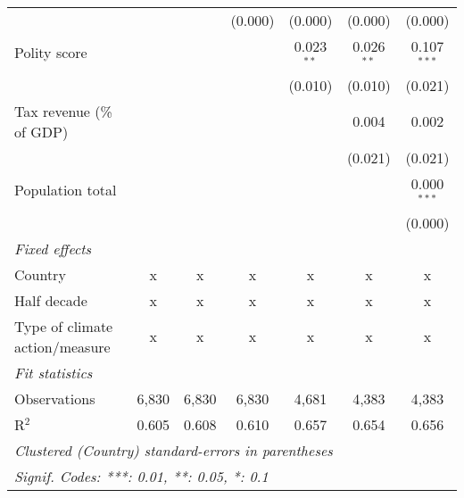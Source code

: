 \begin{tabular}{lcccccc}
                                                                              &              &                & (0.000)        & (0.000)        & (0.000)        & (0.000)\\   
   Polity score                                                               &              &                &                & 0.023$^{**}$   & 0.026$^{**}$   & 0.107$^{***}$\\   
                                                                              &              &                &                & (0.010)        & (0.010)        & (0.021)\\   
   Tax revenue (\% of GDP)                                                    &              &                &                &                & 0.004          & 0.002\\   
                                                                              &              &                &                &                & (0.021)        & (0.021)\\   
   Population total                                                           &              &                &                &                &                & 0.000$^{***}$\\   
                                                                              &              &                &                &                &                & (0.000)\\   
   \emph{Fixed effects}\\
   Country                                                                    & x            & x              & x              & x              & x              & x\\  
   Half decade                                                                & x            & x              & x              & x              & x              & x\\  
   Type of climate action/measure                                             & x            & x              & x              & x              & x              & x\\  
   \midrule \emph{Fit statistics}\\
   Observations                                                               & 6,830        & 6,830          & 6,830          & 4,681          & 4,383          & 4,383\\  
   R$^2$                                                                      & 0.605        & 0.608          & 0.610          & 0.657          & 0.654          & 0.656\\  
   \midrule
   \multicolumn{7}{l}{\emph{Clustered (Country) standard-errors in parentheses}}\\
   \multicolumn{7}{l}{\emph{Signif. Codes: ***: 0.01, **: 0.05, *: 0.1}}\\
\end{tabular}
\par\endgroup


